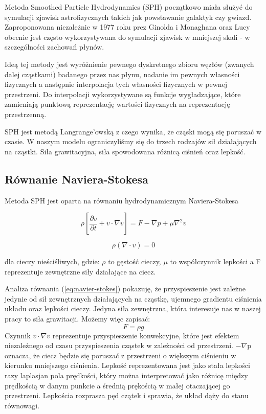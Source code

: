 \documentclass[polish, 12pt]{aghthesis}
\begin{document}
			Metoda Smoothed Particle Hydrodynamics (SPH) początkowo miała służyć do symulacji zjawisk astrofizycznych takich jak powstawanie galaktyk czy gwiazd. Zaproponowana niezależnie w 1977 roku prez Ginolda i Monaghana oraz Lucy obecnie jest często wykorzystywana do symulacji zjawisk w mniejszej skali - w szczególności zachowań płynów. 

			Ideą tej metody jest wyróżnienie pewnego dyskretnego zbioru węzłów (zwanych dalej cząstkami) badanego przez nas płynu, nadanie im pewnych własności fizycznych a następnie interpolacja tych własności fizycznych w pewnej przestrzeni. Do interpolacji wykorzystywane są funkcje wygładzające, które zamieniają punktową reprezentację wartości fizycznych na reprezentację przestrzenną.

			SPH jest metodą Langrange'owską z czego wynika, że cząski mogą się poruszać w czasie. W naszym modelu ograniczyliśmy się do trzech rodzajów sił działających na cząstki. Siła grawitacyjna, siła spowodowana różnicą ciśnień oraz lepkość.

		\subsection{Równanie Naviera-Stokesa}

			Metoda SPH jest oparta na równaniu hydrodynamicznym Naviera-Stokesa

			\[{\rho}[\frac{\partial v}{\partial t} + v \cdot \nabla v ]= F - \nabla p + \mu \nabla^2 v \label{eq:navier-stokes} \tag{1}\]

			\[{\rho}(\nabla \cdot v)=0 \label{eq:continuity} \tag{2}\]

			dla cieczy nieściśliwych, gdzie: ${\rho}$ to gęstość cieczy, ${\mu}$ to współczynnik lepkości a F reprezentuje zewnętrzne siły działające na ciecz.
			
			Analiza równania (\ref{eq:navier-stokes}) pokazuję, że przyspieszenie jest zależne jedynie od sił zewnętrznych działających na cząstkę, ujemnego gradientu ciśnienia układu oraz lepkości cieczy. Jedyna siła zewnętrzna, która interesuje nas w naszej pracy to siła grawitacji. Możemy więc zapisać: \[F={\rho}g \label {eq:gravity_force} \tag{3} \] Czynnik $v {\cdot} {\nabla} v$ reprezentuje przyspieszenie konwekcyjne, które jest efektem niezależnego od czasu przyspieszenia cząstek w zależności od przestrzeni. $-{\nabla}$p oznacza, że ciecz będzie się poruszać z przestrzeni o większym ciśnieniu w kierunku mniejszego ciśnienia. Lepkość reprezentowana jest jako stała lepkości razy laplasjan pola prędkości, który można interpretować jako różnicę między prędkością w danym punkcie a średnią prękością w małej otaczającej go przestrzeni. Lepkościa rozprasza pęd czątek i sprawia, że układ dąży do stanu równowagi.
			
\end{document}
